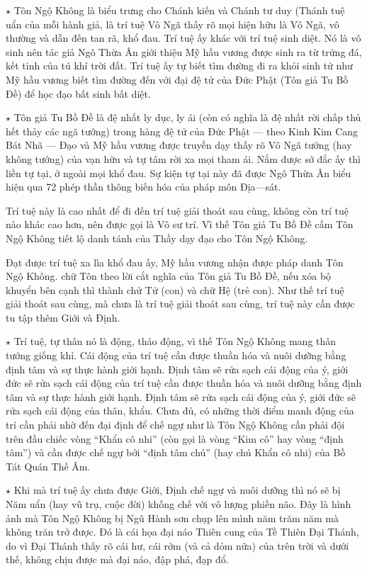$\star$ Tôn Ngộ Không là biểu trưng cho Chánh kiến và Chánh tư duy (Thánh tuệ uẩn của mỗi hành giả, là trí tuệ Vô Ngã thấy rõ mọi hiện hữu là Vô Ngã, vô thường và dẫn đến tan rã, khổ đau. Trí tuệ ấy khác với trí tuệ sinh diệt. Nó là vô sinh nên tác giả Ngô Thừa Ân giới thiệu Mỹ hầu vương được sinh ra từ trứng đá, kết tinh của tú khí trời đất. Trí tuệ ấy tự biết tìm đường đi ra khỏi sinh tử như Mỹ hầu vương biết tìm đường đến với đại đệ tử của Đức Phật (Tôn giả Tu Bồ Đề) để học đạo bất sinh bất diệt.

$\star$ Tôn giả Tu Bồ Đề là đệ nhất ly dục, ly ái (còn có nghĩa là đệ nhất rời chấp thủ hết thảy các ngã tướng) trong hàng đệ tử của Đức Phật — theo Kinh Kim Cang Bát Nhã — Đạo và Mỹ hầu vương được truyền dạy thấy rõ Vô Ngã tướng (hay không tướng) của vạn hữu và tự tâm rời xa mọi tham ái. Nắm được sở đắc ấy thì liền tự tại, ở ngoài mọi khổ đau. Sự kiện tự tại này đã được Ngô Thừa Ân biểu hiện qua 72 phép thần thông biến hóa của pháp môn Địa—sát.

Trí tuệ này là cao nhất để đi đến trí tuệ giải thoát sau cùng, không còn trí tuệ nào khác cao hơn, nên được gọi là Vô sư trí. Vì thế Tôn giả Tu Bồ Đề cấm Tôn Ngộ Không tiết lộ danh tánh của Thầy dạy đạo cho Tôn Ngộ Không.

Đạt được trí tuệ xa lìa khổ đau ấy, Mỹ hầu vương nhận được pháp danh Tôn Ngộ Không. chữ Tôn theo lời cắt nghĩa của Tôn giả Tu Bồ Đề, nếu xóa bộ khuyển bên cạnh thì thành chử Tử (con) và chữ Hệ (trẻ con). Như thế trí tuệ giải thoát sau cùng, mà chưa là trí tuệ giải thoát sau cùng, trí tuệ này cần được tu tập thêm Giới và Định.

$\star$ Trí tuệ, tự thân nó là động, tháo động, vì thế Tôn Ngộ Không mang thân tướng giống khỉ. Cái động của trí tuệ cần được thuần hóa và nuôi dưỡng bằng định tâm và sự thực hành giới hạnh. Định tâm sẽ rửa sạch cái động của ý, giới đức sẽ rửa sạch cái động của trí tuệ cần được thuần hóa và nuôi dưỡng bằng định tâm và sự thực hành giới hạnh. Định tâm sẽ rửa sạch cái động của ý, giới đức sẽ rửa sạch cái động của thân, khẩu. Chưa đủ, có những thời điểm manh động của trí cần phải nhờ đến đại định để chế ngự như là Tôn Ngộ Không cần phải đội trên đầu chiếc vòng ``Khẩn cô nhi'' (còn gọi là vòng ``Kim cô'' hay vòng ``định tâm'') và cần được chế ngự bởi ``định tâm chú'' (hay chú Khẩn cô nhi) của Bồ Tát Quán Thế Âm.

$\star$ Khi mà trí tuệ ấy chưa được Giới, Định chế ngự và nuôi dưỡng thì nó sẽ bị Năm uẩn (hay vũ trụ, cuộc đời) khống chế với vô lượng phiền não. Đây là hình ảnh mà Tôn Ngộ Không bị Ngũ Hành sơn chụp lên mình năm trăm năm mà không trăn trở được. Đó là cái họa đại náo Thiên cung của Tề Thiên Đại Thánh, do vì Đại Thánh thấy rõ cái hư, cái rởm (và cả dỏm nữa) của trên trời và dưới thế, không chịu được mà đại náo, đập phá, đạp đổ.

